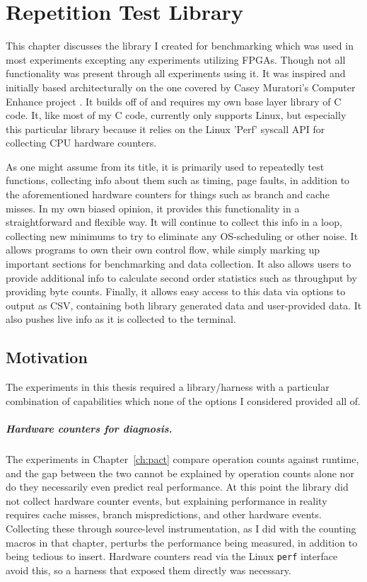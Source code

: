 \chapter{Repetition Test Library}
\label{ch:reptest}

This chapter discusses the library I created for benchmarking which was used in most experiments excepting any experiments utilizing FPGAs. Though not all
functionality was present through all experiments using it. It was inspired
and initially based architecturally on the one covered by Casey Muratori's Computer Enhance project \cite{muratori}. It builds off of and requires my own base
layer library of C code. It, like most of my C code, currently only supports Linux, but especially this particular library because it relies on the
Linux 'Perf' \cite{perf_2024} syscall API for collecting CPU hardware counters.

As one might assume from its title, it is primarily used to repeatedly test functions, collecting info
about them such as timing, page faults, in addition to the aforementioned hardware counters for things such as branch and cache misses. In my own biased opinion,
it provides this functionality in a straightforward and flexible way. It will continue to collect this info in a loop, collecting new minimums to try to
eliminate any OS-scheduling or other noise. It allows programs to own their own control flow, while simply marking up important
sections for benchmarking and data collection. It also allows users to provide additional info to calculate second order statistics such as throughput by
providing byte counts. Finally, it allows easy access to this data via options to output as CSV, containing both library generated data and user-provided data.
It also pushes live info as it is collected to the terminal.

\section{Motivation}
The experiments in this thesis required a library/harness with a particular combination of capabilities which none of the options I considered provided all of.

\paragraph{Hardware counters for diagnosis.}
The experiments in Chapter~\ref{ch:pact} compare operation counts against
runtime, and the gap between the two cannot be explained by operation
counts alone nor do they necessarily even predict real performance. At this point the library did not collect hardware counter events, but explaining
performance in reality requires cache misses, branch mispredictions,
and other hardware events. Collecting these through source-level
instrumentation, as I did with the counting macros in that chapter,
perturbs the performance being measured, in addition to being tedious to insert. Hardware counters read via
the Linux \texttt{perf} interface \cite{perf_2024} avoid this, so a harness that exposed them directly was necessary.


